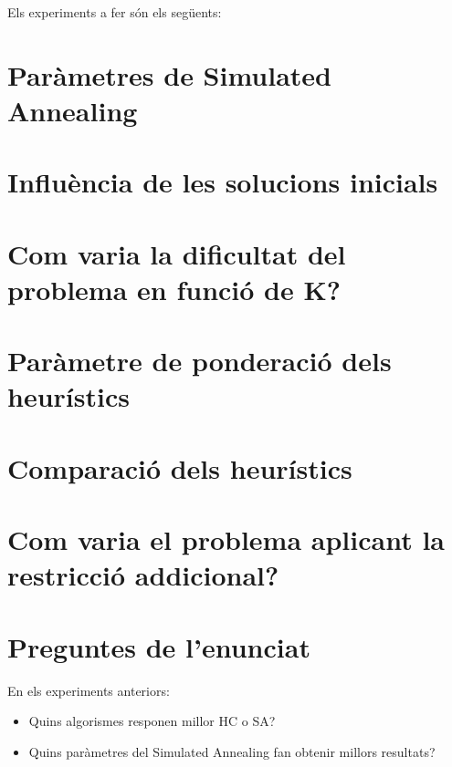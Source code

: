 
Els experiments a fer són els següents:

\section{Paràmetres de Simulated Annealing} %
\label{sec:expSA}


\section{Influència de les solucions inicials} %
\label{sec:expsolini}

	
\newpage
\section{Com varia la dificultat del problema en funció de K?} %
\label{sec:expk}



\newpage %
\section{Paràmetre de ponderació dels heurístics} %
\label{sec:expkh}


\section{Comparació dels heurístics} %
\label{sec:comph1h2}




\section{Com varia el problema aplicant la restricció addicional?} %
\label{sec:restadd}





\section{Preguntes de l'enunciat} %
\label{sec:preguntes}

En els experiments anteriors:
\begin{itemize}
\item Quins algorismes responen millor HC o SA?
\item Quins paràmetres del Simulated Annealing fan obtenir millors resultats?
\end{itemize}

